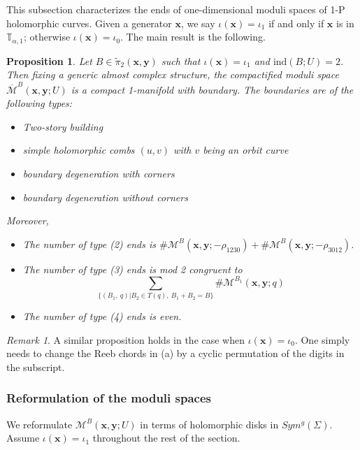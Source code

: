 \documentclass{amsart}
\newtheorem{prop}[thm]{Proposition}
\theoremstyle{definition}
\theoremstyle{remark}
\newtheorem{rmk}[thm]{Remark}
\numberwithin{equation}{section}
\numberwithin{equation}{section} \makeatletter
\begin{document}
This subsection characterizes the ends of one-dimensional moduli spaces of 1-P holomorphic curves. Given a generator $\bm{x}$, we say $\iota(\bm{x})=\iota_1$ if and only if $\bm{x}$ is in $\mathbb{T}_{\alpha,1}$; otherwise $\iota(\bm{x})=\iota_0$. The main result is the following.  
\begin{prop}\label{Proposition, ends of moduli space of 1-P curves}
Let $B\in\tilde{\pi}_2(\bm{x},\bm{y})$ such that $\iota(\bm{x})=\iota_1$ and $\text{ind}(B;U)=2$. Then fixing a generic almost complex structure, the compactified moduli space $\overline{\mathcal{M}}^B(\bm{x},\bm{y};U)$ is a compact 1-manifold with boundary. The boundaries are of the following types:
\begin{itemize}
\item[(1)]Two-story building
\item[(2)]simple holomorphic combs $(u,v)$ with $v$ being an orbit curve
\item[(3)]boundary degeneration with corners
\item[(4)]boundary degeneration without corners
\end{itemize}
Moreover, 
\begin{itemize}
\item[(a)]The number of type (2) ends is $\#\mathcal{M}^B(\bm{x},\bm{y};-\rho_{1230})+\#\mathcal{M}^B(\bm{x},\bm{y};-\rho_{3012})$.
\item[(b)]The number of type (3) ends is mod 2 congruent to $$\sum_{\{(B_1,\ q)|B_2\in T(q),\ B_1+B_2=B\}}\#\mathcal{M}^{B_1}(\bm{x},\bm{y};q)$$
\item[(c)]The number of type (4) ends is even.
\end{itemize}
\end{prop}
\begin{rmk}
A similar proposition holds in the case when $\iota(\bm{x})=\iota_0$. One simply needs to change the Reeb chords in (a) by a cyclic permutation of the digits in the subscript. 
\end{rmk}

\subsubsection{Reformulation of the moduli spaces}
We reformulate $\mathcal{M}^B(\bm{x},\bm{y};U)$ in terms of holomorphic disks in $Sym^g(\Sigma)$. Assume $\iota(\bm{x})=\iota_1$ throughout the rest of the section.
\end{document}
